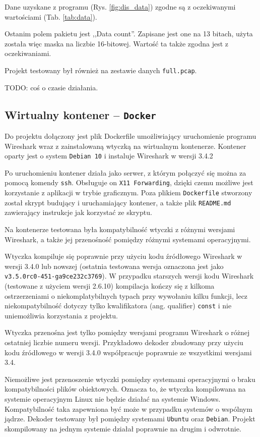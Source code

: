 \documentclass[a4paper, 12pt, twoside, openright]{article}
\begin{document}
	Dane uzyskane z programu (Rys. \ref{fig:dis_data}) zgodne są z oczekiwanymi wartościami (Tab. \ref{tab:data}).

	Ostanim polem pakietu jest ,,Data count''. Zapisane jest one na 13 bitach, użyta została więc maska na liczbie 16-bitowej.
	Wartość ta także zgodna jest z oczekiwaniami.

	Projekt testowany był również na zestawie danych \texttt{full.pcap}.

	TODO: coś o czasie działania.

	\subsection{Wirtualny kontener -- \texttt{Docker}}

	Do projektu dołączony jest plik Dockerfile umożliwiający uruchomienie programu Wireshark wraz z zainstalowaną wtyczką
	na wirtualnym kontenerze. Kontener oparty jest o system \texttt{Debian 10} i instaluje Wireshark w wersji 3.4.2

	Po uruchomieniu kontener działa jako serwer, z którym połączyć się można za pomocą komendy \texttt{ssh}.
	Obsługuje on \texttt{X11 Forwarding}, dzięki czemu możliwe jest korzystanie z aplikacji w trybie graficznym.
	Poza plikiem \texttt{Dockerfile} stworzony został skrypt budujący i uruchamiający kontener, a także plik
	\texttt{README.md} zawierający instrukcje jak korzystać ze skryptu.

	Na kontenerze testowana była kompatybilność wtyczki z różnymi wersjami Wireshark, a także jej przenośność pomiędzy
	różnymi systemami operacyjnymi.

	Wtyczka kompiluje się poprawnie przy użyciu kodu źródłowego Wireshark w wersji 3.4.0 lub nowszej (ostatnia testowana
	wersja oznaczona jest jako \texttt{v3.5.0rc0-451-ga9ce232c3769}). W przypadku starszych wersji kodu Wireshark
	(testowane z użyciem wersji 2.6.10) kompilacja kończy się z kilkoma ostrzerzeniami o niekomplatybilnych typach przy
	wywołaniu kilku funkcji, lecz niekompatybilność dotyczy tylko kwalifikatora (ang. qualifier) \texttt{const}
	i nie uniemożliwia korzystania z projektu.

	Wtyczka przenośna jest tylko pomiędzy wersjami programu Wireshark o różnej ostatniej liczbie numeru wersji.
	Przykładowo dekoder zbudowany przy użyciu kodu źródłowego w wersji 3.4.0 współpracuje poprawnie ze wszystkimi wersjami
	3.4.

	Niemożliwe jest przenoszenie wtyczki pomiędzy systemami operacyjnymi o braku kompatybilności plików obiektowych.
	Oznacza to, że wtyczka kompilowana na systemie operacyjnym Linux nie będzie działać na systemie Windows.
	Kompatybilność taka zapewniona być może w przypadku systemów o wspólnym jądrze. Dekoder testowany był
	pomiędzy systemami \texttt{Ubuntu} oraz \texttt{Debian}. Projekt skompilowany na jednym systemie działał poprawnie
	na drugim i odwrotnie.
\end{document}

